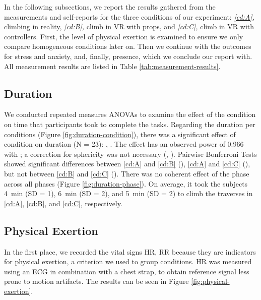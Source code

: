In the following subsections, we report the results gathered from the measurements and self-reports for the three conditions of our experiment: \textit{\ref{cd:A},} climbing in reality, \textit{\ref{cd:B},} climb in \gls{VR} with props, and \textit{\ref{cd:C},} climb in \gls{VR} with controllers. First, the level of physical exertion is examined to ensure we only compare homogeneous conditions later on. Then we continue with the outcomes for stress and anxiety, and, finally, presence, which we conclude our report with. All measurement results are listed in Table \vref{tab:measurement-results}.

 

\subsection{Duration}

We conducted repeated measures \glspl{ANOVA} to examine the effect of the condition on time that participants took to complete the tasks. Regarding the duration per conditions (Figure \ref{fig:duration-condition}), there was a significant effect of condition on duration (N = 23): , . The effect has an observed power of 0.966 with ; a correction for sphericity was not necessary (, ). Pairwise Bonferroni Tests showed significant differences between \ref{cd:A} and \ref{cd:B} (), \ref{cd:A} and \ref{cd:C} (), but not between \ref{cd:B} and \ref{cd:C} (). There was no coherent effect of the phase across all phases (Figure \ref{fig:duration-phase}). On average, it took the subjects \SI{4}{\minute} (SD = 1), \SI{6}{\minute} (SD = 2), and \SI{5}{\minute} (SD = 2) to climb the traverses in \ref{cd:A}, \ref{cd:B}, and \ref{cd:C}, respectively. 

\subsection{Physical Exertion}

In the first place, we recorded the vital signs \gls{HR}, \gls{RR} because they are indicators for physical exertion, a criterion we used to group conditions. \gls{HR} was measured using an \gls{ECG} in combination with a chest strap, to obtain reference signal less prone to motion artifacts. The results can be seen in Figure \vref{fig:physical-exertion}.

